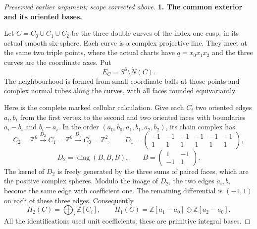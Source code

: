 \begin{proof}[Preserved earlier argument; scope corrected above]
\par\medskip\noindent\textbf{1. The common exterior and its oriented bases.}\enspace

Let \(C=C_0\cup C_1\cup C_2\) be the three double curves of the
index-one cusp, in its actual smooth six-sphere. Each curve is a
complex projective line. They meet at the same two triple points,
where the actual charts have \(q=x_0x_1x_2\) and the three curves
are the coordinate axes. Put
\[
 E_C=S^6\setminus\mathring N(C).
\]
The neighbourhood is formed from small coordinate balls at those
points and complex normal tubes along the curves, with all faces
rounded equivariantly.

Here is the complete marked cellular calculation. Give each
\(C_i\) two oriented edges \(a_i,b_i\) from the first vertex
to the second and two oriented faces with boundaries
\(a_i-b_i\) and \(b_i-a_i\). In the order
\((a_0,b_0,a_1,b_1,a_2,b_2)\), its chain complex has
\[
 C_2=\mathbb Z^6\xrightarrow{D_2}C_1=\mathbb Z^6
                      \xrightarrow{D_1}C_0=\mathbb Z^2,
 \qquad
 D_1=\begin{pmatrix}-1&-1&-1&-1&-1&-1\\
                     1&1&1&1&1&1\end{pmatrix},
\]
\[
 D_2=\operatorname{diag}(B,B,B),\qquad
               B=\begin{pmatrix}1&-1\\-1&1\end{pmatrix}.
\]
The kernel of \(D_2\) is freely generated by the three
sums of paired faces, which are the positive complex
spheres. Modulo the image of \(D_2\), the two edges
\(a_i,b_i\) become the same edge with coefficient one.
The remaining differential is
\((-1,1)\) on each of these three edges. Consequently
\[
 H_2(C)=\bigoplus_i\mathbb Z[C_i],\qquad
 H_1(C)=\mathbb Z[a_1-a_0]\oplus\mathbb Z[a_2-a_0].
\]
All the identifications used unit coefficients; these
are primitive integral bases.


\end{proof}
